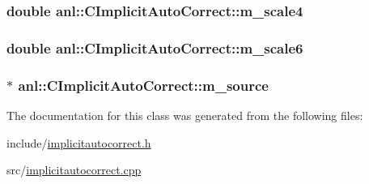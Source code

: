 \label{classanl_1_1CImplicitAutoCorrect_ab52a888f5fd8fad6b8f33e57f3217a6c}
\hypertarget{classanl_1_1CImplicitAutoCorrect_a6274318f027640bfae30c8c0f23b4d94}{
\subsubsection[{m\_\-scale4}]{\setlength{\rightskip}{0pt plus 5cm}double {\bf anl::CImplicitAutoCorrect::m\_\-scale4}}}
\label{classanl_1_1CImplicitAutoCorrect_a6274318f027640bfae30c8c0f23b4d94}
\hypertarget{classanl_1_1CImplicitAutoCorrect_aba696caa637c56a234a84d6ab1daf141}{
\subsubsection[{m\_\-scale6}]{\setlength{\rightskip}{0pt plus 5cm}double {\bf anl::CImplicitAutoCorrect::m\_\-scale6}}}
\label{classanl_1_1CImplicitAutoCorrect_aba696caa637c56a234a84d6ab1daf141}
\hypertarget{classanl_1_1CImplicitAutoCorrect_af44394b98ab6814aadf30964a9766c1f}{
\subsubsection[{m\_\-source}]{$\ast$ {\bf anl::CImplicitAutoCorrect::m\_\-source}}}
\label{classanl_1_1CImplicitAutoCorrect_af44394b98ab6814aadf30964a9766c1f}


The documentation for this class was generated from the following files:\begin{DoxyCompactItemize}
\item 
include/\hyperlink{implicitautocorrect_8h}{implicitautocorrect.h}\item 
src/\hyperlink{implicitautocorrect_8cpp}{implicitautocorrect.cpp}\end{DoxyCompactItemize}
